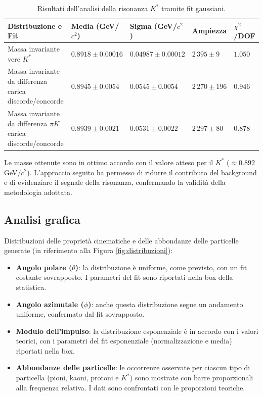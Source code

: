 \documentclass[a4paper,11pt]{article}
\begin{document}
\begin{table}[h!]
    \centering
    \begin{tabular}{|m{2.5cm}|>{\centering\arraybackslash}m{2cm}|>{\centering\arraybackslash}m{2cm}|>{\centering\arraybackslash}m{2cm}|>{\centering\arraybackslash}m{1.5cm}|}
        \hline
        \textbf{Distribuzione e Fit} & \textbf{Media (GeV/$c^2$)} & \textbf{Sigma (GeV/$c^2$)} & \textbf{Ampiezza} & $\chi^2$/DOF \\
        \hline
        Massa invariante vere \( K^* \) & $0.8918 \pm 0.00016$ & $0.04987 \pm 0.00012$ & $2\,395 \pm 9$ & $1.050$ \\
        \hline
        Massa invariante da differenza carica discorde/concorde & $0.8945 \pm 0.0054$ & $0.0545 \pm 0.0054$ & $2\,270 \pm 196$ & $0.946$ \\
        \hline
        Massa invariante da differenza $\pi K$ carica discorde/concorde & $0.8939 \pm 0.0021$ & $0.0531 \pm 0.0022$ & $2\,297 \pm 80$ & $0.878$ \\
        \hline
    \end{tabular}
    \caption{Risultati dell'analisi della risonanza \( K^* \) tramite fit gaussiani.}
    \label{tab:kstar}
\end{table}

Le masse ottenute sono in ottimo accordo con il valore atteso per il \( K^* \) ($\approx 0.892$ GeV/$c^2$). L'approccio seguito ha permesso di ridurre il contributo del background e di evidenziare il segnale della risonanza, confermando la validità della metodologia adottata.

\clearpage

\subsection{Analisi grafica}

Distribuzioni delle proprietà cinematiche e delle abbondanze delle particelle generate (in riferimento alla Figura \ref{fig:distribuzioni}):

\begin{itemize}
    \item \textbf{Angolo polare (\( \theta \))}: la distribuzione è uniforme, come previsto, con un fit costante sovrapposto. I parametri del fit sono riportati nella box della statistica.
    \item \textbf{Angolo azimutale (\( \phi \))}: anche questa distribuzione segue un andamento uniforme, confermato dal fit sovrapposto.
    \item \textbf{Modulo dell'impulso}: la distribuzione esponenziale è in accordo con i valori teorici, con i parametri del fit esponenziale (normalizzazione e media) riportati nella box.
    \item \textbf{Abbondanze delle particelle}: le occorrenze osservate per ciascun tipo di particella (pioni, kaoni, protoni e \( K^* \)) sono mostrate con barre proporzionali alla frequenza relativa. I dati sono confrontati con le proporzioni teoriche.
\end{itemize}
\end{document}
